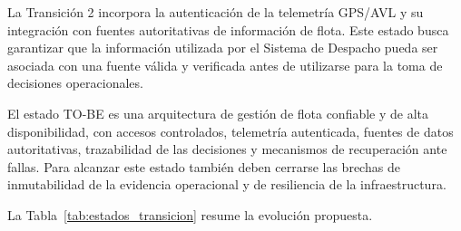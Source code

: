La Transición 2 incorpora la autenticación de la telemetría GPS/AVL y su integración
con fuentes autoritativas de información de flota. Este estado busca garantizar que la
información utilizada por el Sistema de Despacho pueda ser asociada con una fuente válida y
verificada antes de utilizarse para la toma de decisiones operacionales.

El estado TO-BE es una arquitectura de gestión de flota confiable y
de alta disponibilidad, con accesos controlados, telemetría autenticada, fuentes de datos
autoritativas, trazabilidad de las decisiones y mecanismos de recuperación ante fallas. Para
alcanzar este estado también deben cerrarse las brechas de inmutabilidad de la evidencia
operacional y de resiliencia de la infraestructura.

La Tabla~\ref{tab:estados_transicion} resume la evolución propuesta.

